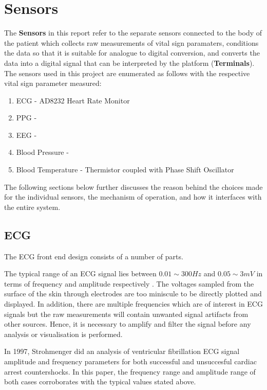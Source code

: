 \chapter{Sensors} 
\label{sensors}

The {\bf Sensors} in this report refer to the separate sensors connected to the body of the patient which collects raw measurements of vital sign paramaters, conditions the data so that it is suitable for analogue to digital conversion, and converts the data into a digital signal that can be interpreted by the platform ({\bf Terminals}). \\

The sensors used in this project are enumerated as follows with the respective vital sign parameter measured: 

\begin{enumerate}
	\item ECG - AD8232 Heart Rate Monitor 
	\item PPG - 
	\item EEG - 
	\item Blood Pressure - 
	\item Blood Temperature - Thermistor coupled with Phase Shift Oscillator
\end{enumerate}

The following sections below further discusses the reason behind the choices made for the individual sensors, the mechanism of operation, and how it interfaces with the entire system. 

\section{ECG}

The ECG front end design consists of a number of parts. 

The typical range of an ECG signal lies between $0.01\sim 300Hz$ and $0.05\sim 3mV$ in terms of frequency and amplitude respectively \cite{nisignalamplitude}. The voltages sampled from the surface of the skin through electrodes are too miniscule to be directly plotted and displayed. In addition, there are multiple frequencies which are of interest in ECG signals but the raw measurements will contain unwanted signal artifacts from other sources. Hence, it is necessary to amplify and filter the signal before any analysis or visualisation is performed.  

In 1997, Strohmenger \cite{strohmenger1997analysis} did an analysis of ventricular fibrillation ECG signal amplitude and frequency parameters for both successful and unsuccesful cardiac arrest countershocks. In this paper, the frequency range and amplitude range of both cases corroborates with the typical values stated above.  



